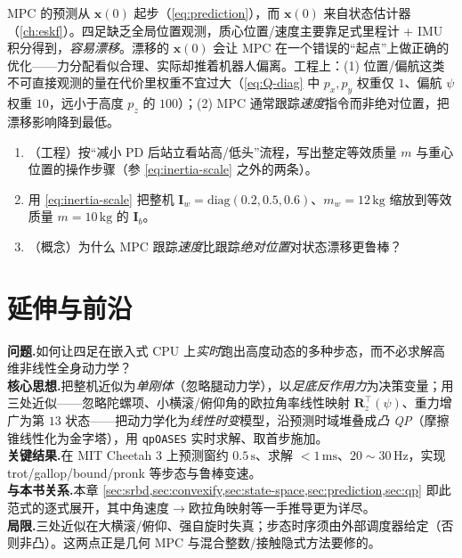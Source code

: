 \begin{pitfall}
MPC 的预测从 $\boldsymbol{x}(0)$ 起步（\cref{eq:prediction}），而 $\boldsymbol{x}(0)$ 来自状态估计器（\cref{ch:eskf}）。四足缺乏全局位置观测，质心位置/速度主要靠足式里程计 + IMU 积分得到，\emph{容易漂移}。漂移的 $\boldsymbol{x}(0)$ 会让 MPC 在一个错误的“起点”上做正确的优化——力分配看似合理、实际却推着机器人偏离。工程上：(1) 位置/偏航这类不可直接观测的量在代价里权重不宜过大（\cref{eq:Q-diag} 中 $p_x,p_y$ 权重仅 $1$、偏航 $\psi$ 权重 $10$，远小于高度 $p_z$ 的 $100$）；(2) MPC 通常跟踪\emph{速度}指令而非绝对位置，把漂移影响降到最低。
\end{pitfall}

\begin{practice}
\begin{enumerate}
  \item （工程）按“减小 PD 后站立看站高/低头”流程，写出整定等效质量 $m$ 与重心位置的操作步骤（参 \cref{eq:inertia-scale} 之外的两条）。
  \item 用 \cref{eq:inertia-scale} 把整机 $\mathbf{I}_w=\mathrm{diag}(0.2,0.5,0.6)$、$m_w=12\,\mathrm{kg}$ 缩放到等效质量 $m=10\,\mathrm{kg}$ 的 $\mathbf{I}_b$。
  \item （概念）为什么 MPC 跟踪\emph{速度}比跟踪\emph{绝对位置}对状态漂移更鲁棒？
\end{enumerate}
\end{practice}

\section{延伸与前沿}
\label{sec:frontier}

\begin{paper}\label{paper:dicarlo}
\textbf{问题.}\;如何让四足在嵌入式 CPU 上\emph{实时}跑出高度动态的多种步态，而不必求解高维非线性全身动力学？\\
\textbf{核心思想.}\;把整机近似为\emph{单刚体}（忽略腿动力学），以\emph{足底反作用力}为决策变量；用三处近似——忽略陀螺项、小横滚/俯仰角的欧拉角率线性映射 $\mathbf{R}_z^\top(\psi)$、重力增广为第 $13$ 状态——把动力学化为\emph{线性时变}模型，沿预测时域堆叠成\emph{凸 QP}（摩擦锥线性化为金字塔），用 \texttt{qpOASES} 实时求解、取首步施加。\\
\textbf{关键结果.}\;在 MIT Cheetah 3\cite{bledt2018cheetah3} 上预测窗约 $0.5\,\mathrm{s}$、求解 $<1\,\mathrm{ms}$、$20\sim30\,\mathrm{Hz}$，实现 trot/gallop/bound/pronk 等步态与鲁棒变速。\\
\textbf{与本书关系.}\;本章 \cref{sec:srbd,sec:convexify,sec:state-space,sec:prediction,sec:qp} 即此范式的逐式展开，其中角速度$\to$欧拉角映射等一手推导更为详尽\cite{yu2021quadruped}。\\
\textbf{局限.}\;三处近似在大横滚/俯仰、强自旋时失真；步态时序须由外部调度器给定（否则非凸）。这两点正是几何 MPC 与混合整数/接触隐式方法要修的。
\end{paper}

